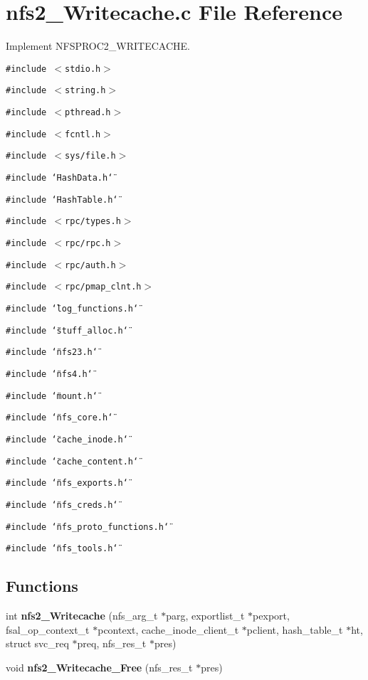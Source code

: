 \section{nfs2\_\-Writecache.c File Reference}
\label{nfs2__Writecache_8c}
Implement NFSPROC2\_\-WRITECACHE.  


{\tt \#include $<$stdio.h$>$}\par
{\tt \#include $<$string.h$>$}\par
{\tt \#include $<$pthread.h$>$}\par
{\tt \#include $<$fcntl.h$>$}\par
{\tt \#include $<$sys/file.h$>$}\par
{\tt \#include \char`\"{}HashData.h\char`\"{}}\par
{\tt \#include \char`\"{}HashTable.h\char`\"{}}\par
{\tt \#include $<$rpc/types.h$>$}\par
{\tt \#include $<$rpc/rpc.h$>$}\par
{\tt \#include $<$rpc/auth.h$>$}\par
{\tt \#include $<$rpc/pmap\_\-clnt.h$>$}\par
{\tt \#include \char`\"{}log\_\-functions.h\char`\"{}}\par
{\tt \#include \char`\"{}stuff\_\-alloc.h\char`\"{}}\par
{\tt \#include \char`\"{}nfs23.h\char`\"{}}\par
{\tt \#include \char`\"{}nfs4.h\char`\"{}}\par
{\tt \#include \char`\"{}mount.h\char`\"{}}\par
{\tt \#include \char`\"{}nfs\_\-core.h\char`\"{}}\par
{\tt \#include \char`\"{}cache\_\-inode.h\char`\"{}}\par
{\tt \#include \char`\"{}cache\_\-content.h\char`\"{}}\par
{\tt \#include \char`\"{}nfs\_\-exports.h\char`\"{}}\par
{\tt \#include \char`\"{}nfs\_\-creds.h\char`\"{}}\par
{\tt \#include \char`\"{}nfs\_\-proto\_\-functions.h\char`\"{}}\par
{\tt \#include \char`\"{}nfs\_\-tools.h\char`\"{}}\par
\subsection*{Functions}
\begin{CompactItemize}
\item 
int {\bf nfs2\_\-Writecache} (nfs\_\-arg\_\-t $\ast$parg, exportlist\_\-t $\ast$pexport, fsal\_\-op\_\-context\_\-t $\ast$pcontext, cache\_\-inode\_\-client\_\-t $\ast$pclient, hash\_\-table\_\-t $\ast$ht, struct svc\_\-req $\ast$preq, nfs\_\-res\_\-t $\ast$pres)
\item 
void {\bf nfs2\_\-Writecache\_\-Free} (nfs\_\-res\_\-t $\ast$pres)
\end{CompactItemize}


